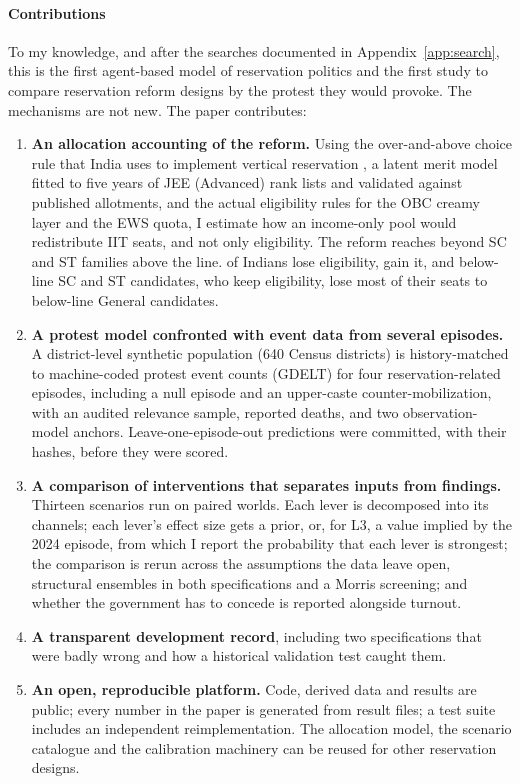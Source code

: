 \documentclass[11pt,a4paper]{article}
\begin{document}
\paragraph{Contributions} To my knowledge, and after the searches documented in Appendix~\ref{app:search}, this is the first agent-based model of reservation politics and the first study to compare reservation reform designs by the protest they would provoke. The mechanisms are not new. The paper contributes:
\begin{enumerate}
\item \textbf{An allocation accounting of the reform.} Using the over-and-above choice rule that India uses to implement vertical reservation \citep{sonmez2022,aygun2023characterization}, a latent merit model fitted to five years of JEE (Advanced) rank lists and validated against published allotments, and the actual eligibility rules for the OBC creamy layer and the EWS quota, I estimate how an income-only pool would redistribute IIT seats, and not only eligibility. The reform reaches beyond SC and ST families above the line. \EligibilityLose{} of Indians lose eligibility, \EligibilityGain{} gain it, and below-line SC and ST candidates, who keep eligibility, lose most of their seats to below-line General candidates.
\item \textbf{A protest model confronted with event data from several episodes.} A district-level synthetic population (640 Census districts) is history-matched \citep{vernon2010,andrianakis2015} to machine-coded protest event counts (GDELT) for four reservation-related episodes, including a null episode and an upper-caste counter-mobilization, with an audited relevance sample, reported deaths, and two observation-model anchors. Leave-one-episode-out predictions were committed, with their hashes, before they were scored.
\item \textbf{A comparison of interventions that separates inputs from findings.} Thirteen scenarios run on paired worlds. Each lever is decomposed into its channels; each lever's effect size gets a prior, or, for L3, a value implied by the 2024 episode, from which I report the probability that each lever is strongest; the comparison is rerun across the assumptions the data leave open, structural ensembles in both specifications and a Morris screening; and whether the government has to concede is reported alongside turnout.
\item \textbf{A transparent development record}, including two specifications that were badly wrong and how a historical validation test caught them.
\item \textbf{An open, reproducible platform.} Code, derived data and results are public; every number in the paper is generated from result files; a test suite includes an independent reimplementation. The allocation model, the scenario catalogue and the calibration machinery can be reused for other reservation designs.
\end{enumerate}
\end{document}

